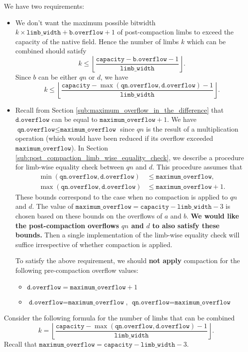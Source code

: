 \documentclass[a4paper, 12pt]{article}
\begin{document}
We have two requirements:
\begin{itemize}
  \item We don't want the maximum possible bitwidth $k\times \texttt{limb\_width} + \texttt{b.overflow} + 1$ of post-compaction limbs to exceed the capacity of the native field. Hence the number of limbs $k$ which can be combined should satisfy
    $$
    k \le \left\lfloor \frac{\texttt{capacity}-\texttt{b.overflow}-1}{\texttt{limb\_width}}\right\rfloor.
    $$
    Since $b$ can be either $qn$ or $d$, we have
    $$
    k \le \left\lfloor \frac{\texttt{capacity}-\max(\texttt{qn.overflow}, \texttt{d.overflow})- 1}{\texttt{limb\_width}}\right\rfloor.
    $$
  \item Recall from Section \ref{sub:maximum_overflow_in_the_difference} that $\texttt{d.overflow}$ can be equal to $\texttt{maximum\_overflow} + 1$. We have $\texttt{qn.overflow} \le \texttt{maximum\_overflow}$ since $qn$ is the result of a multiplication operation (which would have been reduced if its overflow exceeded $\texttt{maximum\_overflow}$). In Section \ref{sub:post_compaction_limb_wise_equality_check}, we describe a procedure for limb-wise equality check between $qn$ and $d$. This procedure assumes that
    \begin{align*}
      \min(\texttt{qn.overflow}, \texttt{d.overflow}) &\le \texttt{maximum\_overflow}, \\
      \max(\texttt{qn.overflow}, \texttt{d.overflow}) &\le \texttt{maximum\_overflow} + 1.
    \end{align*}
    These bounds correspond to the case when no compaction is applied to $qn$ and $d$. The value of $\texttt{maximum\_overflow} = \texttt{capacity} - \texttt{limb\_width} - 3$ is chosen based on these bounds on the overflows of $a$ and $b$. \textbf{We would like the post-compaction overflows $qn$ and $d$ to also satisfy these bounds.} Then a single implementation of the limb-wise equality check will suffice irrespective of whether compaction is applied. 

  To satisfy the above requirement, we should \textbf{not apply} compaction for the following pre-compaction overflow values:
    \begin{itemize}
      \item $\texttt{d.overflow} = \texttt{maximum\_overflow} + 1$
      \item $\texttt{d.overflow} = \texttt{maximum\_overflow}$, $\texttt{qn.overflow} = \texttt{maximum\_overflow}$
    \end{itemize}
\end{itemize}
Consider the following formula for the number of limbs that can be combined
$$
k = \left\lfloor \frac{\texttt{capacity}-\max(\texttt{qn.overflow}, \texttt{d.overflow})- 1}{\texttt{limb\_width}}\right\rfloor.
$$
Recall that $\texttt{maximum\_overflow}= \texttt{capacity} - \texttt{limb\_width} - 3$.
\end{document}
